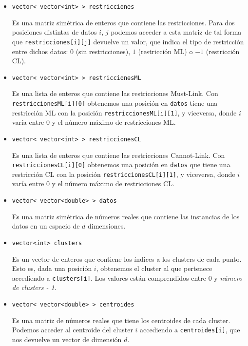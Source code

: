 		\begin{itemize}
			\item \lstinline!vector< vector<int> > restricciones!
			
				Es una matriz simétrica de enteros que contiene las restricciones. Para dos posiciones distintas de datos $i$, $j$ podemos acceder a esta matriz
			de tal forma que \lstinline!restricciones[i][j]! devuelve un valor, que indica el tipo de restricción entre dichos datos: $0$ (sin restricciones), $1$ (restricción ML) o $-1$ (restricción CL).
			
			\item \lstinline!vector< vector<int> > restriccionesML!
				
				Es una lista de enteros que contiene las restricciones Must-Link. Con \lstinline!restriccionesML[i][0]! obtenemos una posición en \lstinline!datos! tiene una restricción ML con la posición \lstinline!restriccionesML[i][1]!, y viceversa, donde $i$ varía entre $0$ y el número máximo de restricciones ML.
			
			\item \lstinline!vector< vector<int> > restriccionesCL!
			
				Es una lista de enteros que contiene las restricciones Cannot-Link. Con \lstinline!restriccionesCL[i][0]! obtenemos una posición en \lstinline!datos! que tiene una restricción CL con la posición \lstinline!restriccionesCL[i][1]!, y viceversa, donde $i$ varía entre $0$ y el número máximo de restricciones CL.
			
			\item \lstinline!vector< vector<double> > datos!
			
				Es una matriz simétrica de números reales que contiene las instancias de los datos en un espacio de $d$ dimensiones.
			
			\item \lstinline!vector<int> clusters!
			
				Es un vector de enteros que contiene los índices a los clusters de cada punto. Esto es, dada una posición $i$, obtenemos el cluster al que pertenece accediendo a \lstinline!clusters[i]!. Los valores están comprendidos entre $0$ y \textit{número de clusters - 1}.
			
			\item \lstinline!vector< vector<double> > centroides!
				
				Es una matriz de números reales que tiene los centroides de cada cluster. Podemos acceder al centroide del cluster $i$ accediendo a \lstinline!centroides[i]!, que nos devuelve un vector de dimensión $d$.
			

\end{itemize}

